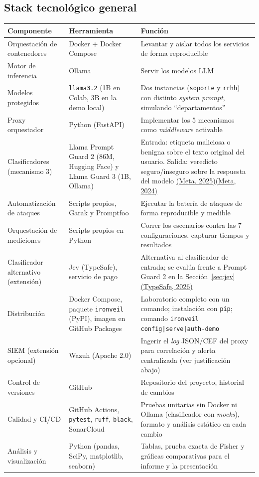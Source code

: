 \documentclass[11pt,letterpaper]{article}
\newcommand{\citeapa}[2]{\hyperlink{#1}{#2}}
\begin{document}
\clearpage

\subsection{Stack tecnológico general}

\begin{center}
\small
\begin{tabular}{@{}p{2.9cm}p{3.4cm}p{7.1cm}@{}}
\toprule
\textbf{Componente} & \textbf{Herramienta} & \textbf{Función} \\
\midrule
Orquestación de contenedores & Docker + Docker Compose & Levantar y aislar todos los servicios de forma reproducible \\
Motor de inferencia & Ollama & Servir los modelos LLM \\
Modelos protegidos & \texttt{llama3.2} (1B en Colab, 3B en la demo local) & Dos instancias (\texttt{soporte} y \texttt{rrhh}) con distinto \emph{system prompt}, simulando ``departamentos'' \\
Proxy orquestador & Python (FastAPI) & Implementar los 5 mecanismos como \emph{middleware} activable \\
Clasificadores (mecanismo 3) & Llama Prompt Guard 2 (86M, Hugging Face) y Llama Guard 3 (1B, Ollama) & Entrada: etiqueta maliciosa o benigna sobre el texto original del usuario. Salida: veredicto seguro/inseguro sobre la respuesta del modelo \citeapa{metapg2025}{(Meta, 2025)}\citeapa{metalg2024}{(Meta, 2024)} \\
Automatización de ataques & Scripts propios, Garak y Promptfoo & Ejecutar la batería de ataques de forma reproducible y medible \\
Orquestación de mediciones & Scripts propios en Python & Correr los escenarios contra las 7 configuraciones, capturar tiempos y resultados \\
Clasificador alternativo (extensión) & Jev (TypeSafe), servicio de pago & Alternativa al clasificador de entrada; se evalúa frente a Prompt Guard 2 en la Sección~\ref{sec:jev} \citeapa{typesafe2026}{(TypeSafe, 2026)} \\
Distribución & Docker Compose, paquete \texttt{ironveil} (PyPI), imagen en GitHub Packages & Laboratorio completo con un comando; instalación con \texttt{pip}; comando \texttt{ironveil config|serve|auth-demo} \\
SIEM (extensión opcional) & Wazuh (Apache 2.0) & Ingerir el \emph{log} JSON/CEF del proxy para correlación y alerta centralizada (ver justificación abajo) \\
Control de versiones & GitHub & Repositorio del proyecto, historial de cambios \\
Calidad y CI/CD & GitHub Actions, \texttt{pytest}, \texttt{ruff}, \texttt{black}, SonarCloud & Pruebas unitarias sin Docker ni Ollama (clasificador con \emph{mocks}), formato y análisis estático en cada cambio \\
Análisis y visualización & Python (pandas, SciPy, matplotlib, seaborn) & Tablas, prueba exacta de Fisher y gráficas comparativas para el informe y la presentación \\
\bottomrule
\end{tabular}
\end{center}
\end{document}
